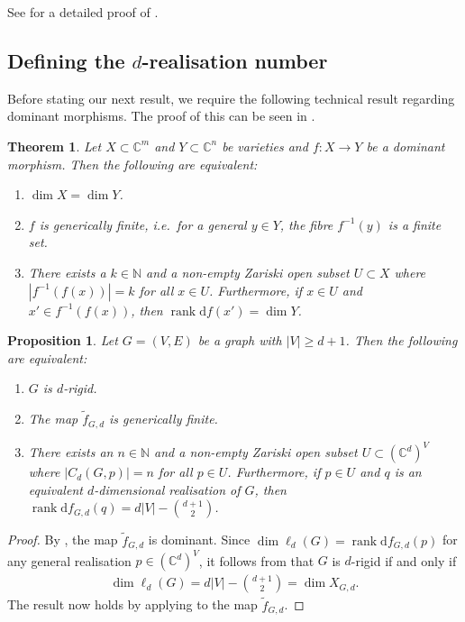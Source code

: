 \documentclass[11pt]{article}
\newtheorem{proposition}[theo]{Proposition}
\newtheorem{theorem}[theo]{Theorem}
\theoremstyle{definition}
\providecommand{\ie}{i.e.\ }
\numberwithin{equation}{section}
\DeclareMathOperator{\rank}{rank}
\newcommand{\diff}{\mathrm{d}}
\begin{document}
See  for a detailed proof of .




\subsection{Defining the \texorpdfstring{$d$-realisation}{d-realisation} number}

Before stating our next result, we require the following technical result regarding dominant morphisms.
The proof of this can be seen in .

\begin{theorem}\label{t:deg}
	Let $X \subset \mathbb{C}^m$ and $Y \subset \mathbb{C}^n$ be varieties and $f:X \rightarrow Y$ be a dominant morphism.
	Then the following are equivalent:
	\begin{enumerate}
		\item \label{t:deg1} $\dim X = \dim Y$.
		\item \label{t:deg2} $f$ is \emph{generically finite},
		\ie for a general $y \in Y$,
		the fibre $f^{-1}(y)$ is a finite set.
		\item \label{t:deg3} There exists a $k \in \mathbb{N}$ and a non-empty Zariski open subset $U \subset X$ where $|f^{-1}(f(x))| = k$ for all $x \in U$.
		Furthermore,
		if $x \in U$ and $x' \in f^{-1}(f(x))$,
		then $\rank \diff f(x') = \dim Y$.
	\end{enumerate}
\end{theorem}

\begin{proposition}\label{p:dom}
	Let $G=(V,E)$ be a graph with $|V| \geq d+1$.
	Then the following are equivalent:
	\begin{enumerate}
		\item\label{p:dom1} $G$ is $d$-rigid.
		\item\label{p:dom2} The map $\tilde{f}_{G,d}$ is generically finite.
		\item\label{p:dom3} There exists an $n \in \mathbb{N}$ and a non-empty Zariski open subset $U \subset (\mathbb{C}^d)^V$ where $ |C_d(G,p)|=n$ for all $p \in U$.
		Furthermore,
		if $p \in U$ and $q$ is an equivalent $d$-dimensional realisation of $G$,
		then $\rank \diff f_{G,d}(q) =  d|V| - \binom{d+1}{2}$.
	\end{enumerate}
\end{proposition} 

\begin{proof}
	By ,
	the map $\tilde{f}_{G,d}$ is dominant.	
	Since $\dim \ell_d(G) = \rank \diff f_{G,d}(p)$ for any general realisation $p\in (\mathbb{C}^d)^V$,
	it follows from  that $G$ is $d$-rigid if and only if 
	\begin{align*}
		\dim \ell_d(G) = d|V|- \binom{d+1}{2} = \dim X_{G,d}.
	\end{align*}
	The result now holds by applying  to the map $\tilde{f}_{G,d}$.
\end{proof}
\end{document}
